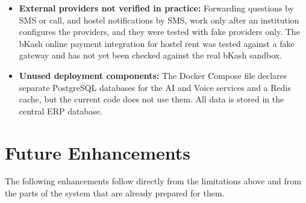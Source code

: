 \begin{itemize}
    \item \textbf{External providers not verified in practice:} Forwarding questions by SMS or call, and hostel notifications by SMS, work only after an institution configures the providers, and they were tested with fake providers only. The bKash online payment integration for hostel rent was tested against a fake gateway and has not yet been checked against the real bKash sandbox.

    \item \textbf{Unused deployment components:} The Docker Compose file declares separate PostgreSQL databases for the AI and Voice services and a Redis cache, but the current code does not use them. All data is stored in the central ERP database.
\end{itemize}

\section{Future Enhancements}
The following enhancements follow directly from the limitations above and from the parts of the system that are already prepared for them.

